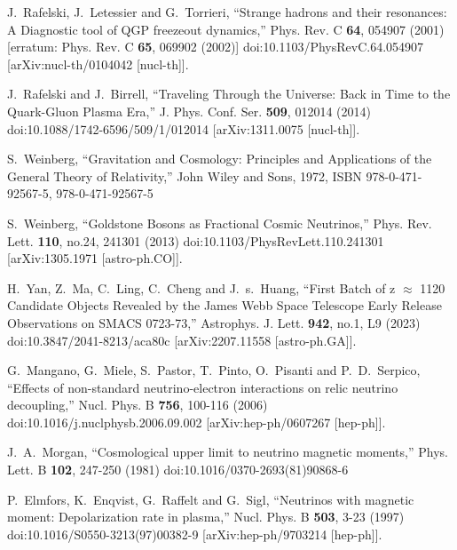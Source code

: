\documentclass[universe,article,submit,moreauthors,pdftex,a4paper]{Definitions/mdpi}
\begin{document}
\begin{thebibliography}{99}
J.~Rafelski, J.~Letessier and G.~Torrieri,
``Strange hadrons and their resonances: A Diagnostic tool of QGP freezeout dynamics,''
Phys. Rev. C \textbf{64}, 054907 (2001)
[erratum: Phys. Rev. C \textbf{65}, 069902 (2002)]
doi:10.1103/PhysRevC.64.054907
[arXiv:nucl-th/0104042 [nucl-th]].

J.~Rafelski and J.~Birrell,
``Traveling Through the Universe: Back in Time to the Quark-Gluon Plasma Era,''
J. Phys. Conf. Ser. \textbf{509}, 012014 (2014)
doi:10.1088/1742-6596/509/1/012014
[arXiv:1311.0075 [nucl-th]].

S.~Weinberg,
``Gravitation and Cosmology: Principles and Applications of the General Theory of Relativity,''
John Wiley and Sons, 1972,
ISBN 978-0-471-92567-5, 978-0-471-92567-5

S.~Weinberg,
``Goldstone Bosons as Fractional Cosmic Neutrinos,''
Phys. Rev. Lett. \textbf{110}, no.24, 241301 (2013)
doi:10.1103/PhysRevLett.110.241301
[arXiv:1305.1971 [astro-ph.CO]].

H.~Yan, Z.~Ma, C.~Ling, C.~Cheng and J.~s.~Huang,
``First Batch of z \ensuremath{\approx} 11\textendash{}20 Candidate Objects Revealed by the James Webb Space Telescope Early Release Observations on SMACS 0723-73,''
Astrophys. J. Lett. \textbf{942}, no.1, L9 (2023)
doi:10.3847/2041-8213/aca80c
[arXiv:2207.11558 [astro-ph.GA]].

G.~Mangano, G.~Miele, S.~Pastor, T.~Pinto, O.~Pisanti and P.~D.~Serpico,
``Effects of non-standard neutrino-electron interactions on relic neutrino decoupling,''
Nucl. Phys. B \textbf{756}, 100-116 (2006)
doi:10.1016/j.nuclphysb.2006.09.002
[arXiv:hep-ph/0607267 [hep-ph]].

J.~A.~Morgan,
``Cosmological upper limit to neutrino magnetic moments,''
Phys. Lett. B \textbf{102}, 247-250 (1981)
doi:10.1016/0370-2693(81)90868-6

P.~Elmfors, K.~Enqvist, G.~Raffelt and G.~Sigl,
``Neutrinos with magnetic moment: Depolarization rate in plasma,''
Nucl. Phys. B \textbf{503}, 3-23 (1997)
doi:10.1016/S0550-3213(97)00382-9
[arXiv:hep-ph/9703214 [hep-ph]].


\end{thebibliography}
\end{document}
